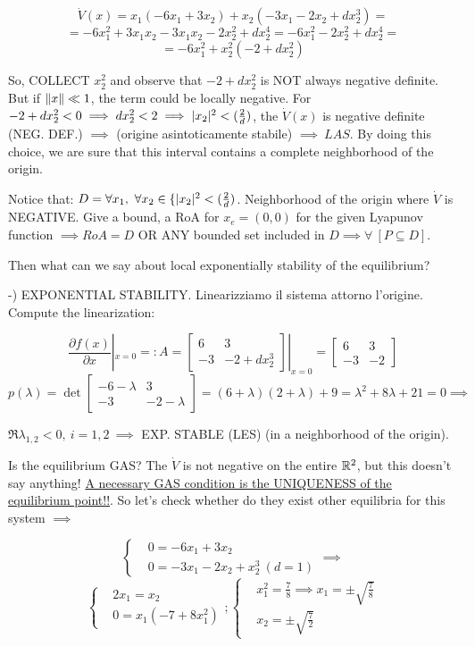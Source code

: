 \[
	\dot{V}(x) = x_1(-6x_1 + 3x_2) + x_2(-3x_1 - 2x_2 + dx_2^3) =
\]
\[
	= -6x_1^2 +3x_1x_2 -3x_1x_2 - 2x_2^2 + dx_2^4 = -6x_1^2 - 2x_2^2 + dx_2^4 =
\]
\[
	= -6x_1^2 + x_2^2(-2+dx_2^2)
\]

So, COLLECT $x_2^2$ and observe that $-2+dx_2^2$ is NOT always negative definite. But if $\lVert x\rVert \ll 1$, the term could be locally negative. For $-2+dx_2^2 < 0 \implies dx_2^2 < 2 \implies \lvert x_2\rvert^2 < (\frac{2}{d})$, the $\dot{V}(x)$ is negative definite (NEG. DEF.) $\implies$ (origine asintoticamente stabile) $\implies\ LAS$. By doing this choice, we are sure that this interval contains a complete neighborhood of the origin.

Notice that: $D = \forall x_1,\ \forall x_2 \in \{\lvert x_2\rvert^2 < (\frac{2}{d})$. Neighborhood of the origin where $\dot{V}$ is NEGATIVE. Give a bound, a RoA for $x_e=(0,0)$ for the given Lyapunov function $\implies RoA=D$ OR ANY bounded set included in $D \implies \forall\ [P \subseteq D]$.

Then what can we say about local exponentially stability of the equilibrium?

-) EXPONENTIAL STABILITY. Linearizziamo il sistema attorno l'origine. Compute the linearization:

\[
	\frac{\partial{f(x)}}{\partial{x}}|_{x=0} =: A = \begin{bmatrix}6 & 3\\-3 & -2+dx_2^3\end{bmatrix}|_{x=0} = \begin{bmatrix}6&3\\-3&-2\end{bmatrix}
\]
\[
	p(\lambda) = \det{\begin{bmatrix}-6-\lambda & 3\\-3 & -2-\lambda\end{bmatrix}} = (6+\lambda)(2+\lambda) + 9 = \lambda^2 + 8\lambda + 21 = 0 \implies
\]

$\Re{\lambda_{1,2}} < 0,\ i=1,2\ \implies$ EXP. STABLE (LES) (in a neighborhood of the origin).
	
Is the equilibrium GAS? The $\dot{V}$ is not negative on the entire $\mathbb{R}^2$, but this doesn't say anything! \underline{A necessary GAS condition is the UNIQUENESS of the equilibrium point!!}. So let's check whether do they exist other equilibria for this system $\implies$

\[
	\left\{
	\begin{aligned}
	&0 = -6x_1 + 3x_2 \\
	&0 = -3x_1 -2x_2 + x_2^3\ (d=1)
	\end{aligned} 
	\right. \implies
\]
\[
	\left\{
	\begin{aligned}
	&2x_1 = x_2 \\
	&0=x_1(-7+8x_1^2)
	\end{aligned} 
	\right. ; \left\{
	\begin{aligned}
	&x_1^2 = \frac{7}{8} \implies x_1 = \pm \sqrt{\frac{7}{8}} \\
	&x_2 = \pm \sqrt{\frac{7}{2}}
	\end{aligned} 
	\right.
\]


